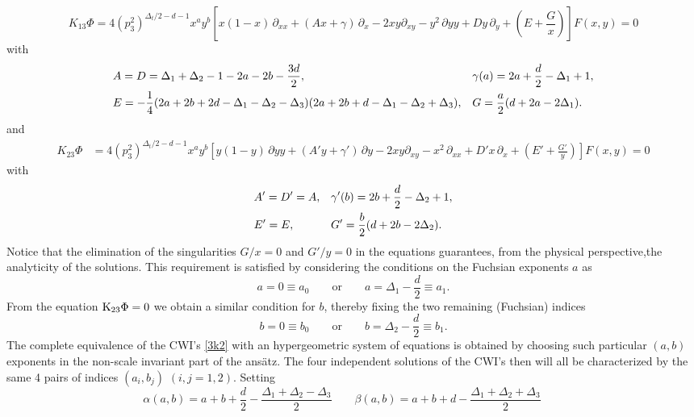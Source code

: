 \documentclass[a4paper,11pt,openright,twoside]{book}
\numberwithin{equation}{section}
\begin{document}
\begin{equation}
	K_{13}\Phi=4 (p_3^2)^{\Delta_t/2 -d -1} x^a y^b
	\left[x(1-x)\,\partial_{xx}  + (A x + \gamma)\,\partial_x -
	2 x y \partial_{xy}- y^2\,\partial{yy} + 
	D y\,\partial_y + \left(E +\frac{G}{x}\right)\right] F(x,y)=0
	\label{red}
\end{equation}
with
\begin{align}
	&A=D=\Delta_1 +\Delta_2 - 1 -2 a -2 b -\frac{3 d}{2}, &&\gamma(a)=2 a +\frac{d}{2} -\Delta_1 + 1,
	\notag\\
	&E=-\frac{1}{4}(2 a + 2 b +2 d -\Delta_1 -\Delta_2 -\Delta_3)(2 a +2 b + d -\Delta_1 -\Delta_2 +\Delta_3),&& G=\frac{a}{2}(d +2 a - 2 \Delta_1).
\end{align}
and
\begin{align}
	K_{23}\Phi &= 4( p_3^2)^{\Delta_t/2 - d -1} x^a y^b
	\left[  y(1-y)\,\partial {yy}   + (A' y + \gamma')\,\partial y -
	2 x y \partial_{xy}- x^2\,\partial_{xx}+ 
	D' x\,\partial_x + \left(E' +\frac{G'}{y}\right)\right]F(x,y)=0\label{red2}
\end{align}
with
\begin{align}
	&A'=D'= A,  &&\gamma'(b)=2 b +\frac{d}{2} -\Delta_2 + 1,\notag\\
	&E'= E,&&G'=\frac{b}{2}(d +2 b - 2 \Delta_2).
\end{align}
Notice that the elimination of the singularities $G/x=0$ and $G'/y=0$ in the equations guarantees, from the physical perspective,the analyticity of the solutions. This requirement is satisfied by considering the conditions on the Fuchsian exponents $a$ as
\begin{equation}
	\label{cond1}
	a=0\equiv a_0 \qquad \textrm{or} \qquad a=\Delta_1 -\frac{d}{2}\equiv a_1.
\end{equation}
From the equation $\textup{K}_{23}\Phi=0$ we obtain a similar condition for $b$, thereby fixing the two remaining (Fuchsian) indices
\begin{equation}
	\label{cond2}
	b=0\equiv b_0 \qquad \textrm{or} \qquad b=\Delta_2 -\frac{d}{2}\equiv b_1.
\end{equation}
The complete equivalence of the CWI's \eqref{3k2} with an hypergeometric system of equations is obtained by choosing such particular $(a,b)$ exponents in the non-scale invariant part of the ans\"atz. 
The four independent solutions of the CWI's then will all be characterized by the same 4 pairs of indices $(a_i,b_j)$ $(i,j=1,2)$.
Setting 
\begin{equation}
	\alpha(a,b)= a + b + \frac{d}{2} -\frac{\Delta_1 +\Delta_2 -\Delta_3}{2} \qquad \beta (a,b)=a +  b + d -\frac{\Delta_1 +\Delta_2 +\Delta_3}{2} \qquad 
	\label{alphas}
\end{equation}
\end{document}
